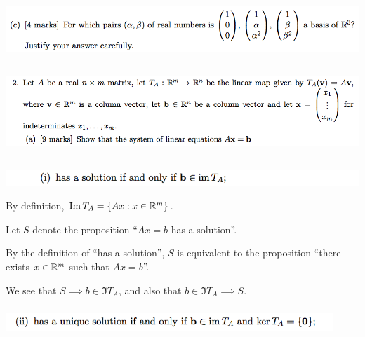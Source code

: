 \documentclass[12pt]{article}
\begin{document}


\begin{mdframed}
\includegraphics[width=400pt]{img/oxford-prelims-2017-A-1-3.png}
\end{mdframed}


\subsection*{}  %
\begin{mdframed}
\includegraphics[width=400pt]{img/oxford-prelims-2017-A-2-1.png}
\end{mdframed}

\subsection*{}  %
\begin{mdframed}
\includegraphics[width=400pt]{img/oxford-prelims-2017-A-2-1-1.png}
\end{mdframed}

By definition,  $\operatorname{\mathrm{Im}} T_A = \{Ax: x \in \mathbb{R}^m\}$.

Let $S$ denote the proposition ``$Ax = b$ has a solution''.

By the definition of ``has a solution'', $S$ is equivalent to the proposition
``there exists $x \in \mathbb{R}^m$ such that $Ax = b$''.

We see that $S \implies b \in \Im T_A$, and also that $b \in \Im T_A \implies S$.

\subsubsection*{} %
\begin{mdframed}
\includegraphics[width=350pt]{img/oxford-prelims-2017-A-2-1-2.png}
\end{mdframed}
\end{document}
